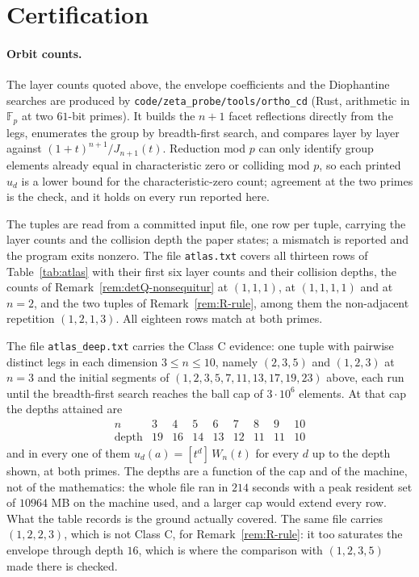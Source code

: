 \documentclass[11pt,a4paper]{article}
\theoremstyle{definition}
\theoremstyle{remark}
\theoremstyle{plain}
\begin{document}
\section{Certification}\label{sec:cert}

\paragraph{Orbit counts.}
The layer counts quoted above, the envelope coefficients and the Diophantine searches are
produced by \texttt{code/zeta\_probe/tools/ortho\_cd} (Rust, arithmetic in $\mathbb{F}_p$ at two
$61$-bit primes). It builds the $n+1$ facet reflections directly from the legs, enumerates the
group by breadth-first search, and compares layer by layer against $(1+t)^{n+1}/J_{n+1}(t)$.
Reduction mod $p$ can only identify group elements already equal in characteristic zero or
colliding mod $p$, so each printed $u_d$ is a lower bound for the characteristic-zero count;
agreement at the two primes is the check, and it holds on every run reported here.

The tuples are read from a committed input file, one row per tuple, carrying the layer counts
and the collision depth the paper states; a mismatch is reported and the program exits nonzero.
The file \texttt{atlas.txt} covers all thirteen rows of Table~\ref{tab:atlas} with their first
six layer counts and their collision depths, the counts of Remark~\ref{rem:detQ-nonsequitur} at
$(1,1,1)$, at $(1,1,1,1)$ and at $n=2$, and the two tuples of Remark~\ref{rem:R-rule}, among
them the non-adjacent repetition $(1,2,1,3)$. All eighteen rows match at both primes.

The file \texttt{atlas\_deep.txt} carries the Class C evidence: one tuple with pairwise distinct
legs in each dimension $3\le n\le10$, namely $(2,3,5)$ and $(1,2,3)$ at $n=3$ and the initial
segments of $(1,2,3,5,7,11,13,17,19,23)$ above, each run until the breadth-first search reaches
the ball cap of $3\cdot10^6$ elements. At that cap the depths attained are
\begin{equation}\label{eq:classC-depths}
\begin{array}{c|cccccccc}
n     & 3 & 4 & 5 & 6 & 7 & 8 & 9 & 10\\\hline
\text{depth} & 19 & 16 & 14 & 13 & 12 & 11 & 11 & 10
\end{array}
\end{equation}
and in every one of them $u_d(a)=[t^d]\,W_n(t)$ for every $d$ up to the depth shown, at both
primes. The depths are a function of the cap and of the machine, not of the mathematics: the
whole file ran in $214$ seconds with a peak resident set of $10964$ MB on the machine used, and
a larger cap would
extend every row. What the table records is the ground actually covered. The same file carries
$(1,2,2,3)$, which is not Class C, for Remark~\ref{rem:R-rule}: it too saturates the envelope
through depth $16$, which is where the comparison with $(1,2,3,5)$ made there is checked.
\end{document}
